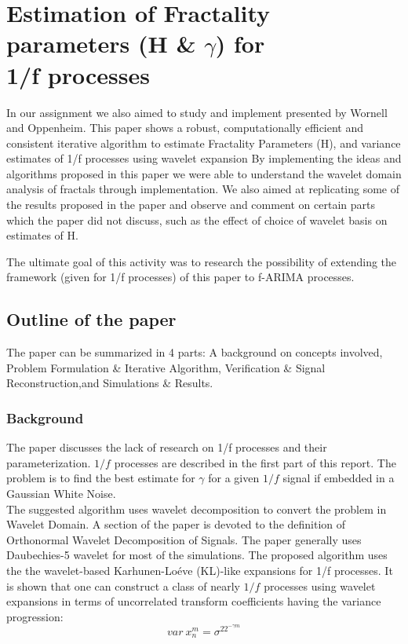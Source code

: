 \documentclass[a4paper]{article}
\begin{document}
\section{Estimation of Fractality parameters (H \& $\gamma$) for \\1/f processes}
In our assignment we also aimed to study and implement \cite{DBLP:journals/tsp/WornellO92} presented by Wornell and Oppenheim. This paper shows a robust, computationally efficient and consistent iterative algorithm to estimate Fractality Parameters (H), ​and variance estimates of 1/f processes using wavelet expansion
By implementing the ideas and algorithms proposed in this paper we were able to understand the wavelet domain analysis of fractals through implementation. We also aimed at replicating some of the results proposed in the paper and observe and comment on certain parts which the paper did not discuss, such as the effect of choice of wavelet basis on estimates of H.

The ultimate goal of this activity was to research the possibility of extending the framework (given for 1/f processes) of this paper to f-ARIMA processes.

\subsection{Outline of the paper}

The paper can be summarized in 4 parts: A background on concepts involved, Problem Formulation \& Iterative Algorithm, Verification \& Signal Reconstruction,and Simulations \& Results.
\subsubsection{Background}
The paper discusses the lack of research on 1/f processes and their parameterization. $1/f$ processes are described in the first part of this report. The problem is to find the best estimate for $\gamma$ for a given $1/f$ signal if embedded in a Gaussian White Noise. \\
The suggested algorithm uses wavelet decomposition to convert the problem in Wavelet Domain. A section of the paper is devoted to the definition of Orthonormal Wavelet Decomposition of Signals. The paper generally uses Daubechies-5 wavelet for most of the simulations. The proposed algorithm uses the the wavelet-based Karhunen-Loéve (KL)-like expansions for 1/f processes. It is shown that one can construct a class of nearly $1 /f$ processes using wavelet expansions in terms of uncorrelated transform coefficients having the variance progression:
$$var\ x_n^m = \sigma^22^{-\gamma m}$$
\end{document}
